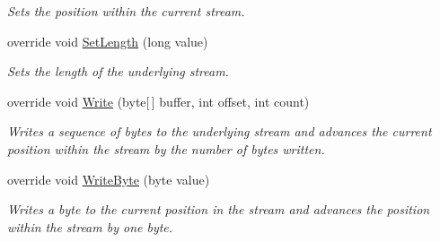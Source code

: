 \begin{DoxyCompactItemize}
\begin{DoxyCompactList}\small\item\em Sets the position within the current stream. \end{DoxyCompactList}\item 
override void \hyperlink{class_p_http_1_1_http_output_stream_adc9a34660dcab180636813dfd7bba7b2}{Set\+Length} (long value)
\begin{DoxyCompactList}\small\item\em Sets the length of the underlying stream. \end{DoxyCompactList}\item 
override void \hyperlink{class_p_http_1_1_http_output_stream_a9ecf846d90af729ce31130fdd58ce57b}{Write} (byte\mbox{[}$\,$\mbox{]} buffer, int offset, int count)
\begin{DoxyCompactList}\small\item\em Writes a sequence of bytes to the underlying stream and advances the current position within the stream by the number of bytes written. \end{DoxyCompactList}\item 
override void \hyperlink{class_p_http_1_1_http_output_stream_abc3e17eed0f5721726d260a0417c6f42}{Write\+Byte} (byte value)
\begin{DoxyCompactList}\small\item\em Writes a byte to the current position in the stream and advances the position within the stream by one byte. \end{DoxyCompactList}\end{DoxyCompactItemize}
